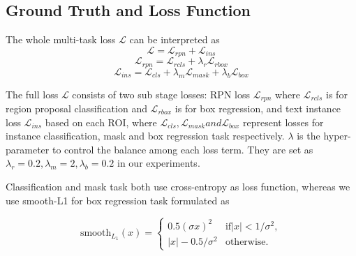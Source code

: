 \documentclass[a4paper,conference]{IEEEtran}
\begin{document}
\subsection{Ground Truth and Loss Function}
The whole multi-task loss \begin{math}\mathcal{L}\end{math} can be interpreted as 
\begin{equation}
    \mathcal{L} =  \mathcal{L}_{rpn} + \mathcal{L}_{ins}
\end{equation}
\begin{equation}
    \mathcal{L}_{rpn} =  \mathcal{L}_{rcls} + \lambda_{r}\mathcal{L}_{rbox}
\end{equation}
\begin{equation}
    \mathcal{L}_{ins} =  \mathcal{L}_{cls} + \lambda_{m}\mathcal{L}_{mask} +  \lambda_{b}\mathcal{L}_{box}
\end{equation}

The full loss \begin{math}\mathcal{L}\end{math} consists of two sub stage losses: RPN loss \begin{math}\mathcal{L}_{rpn}\end{math} where \begin{math}\mathcal{L}_{rcls}\end{math} is for region proposal classification and \begin{math}\mathcal{L}_{rbox}\end{math} is for box regression, and text instance loss \begin{math}\mathcal{L}_{ins}\end{math} based on each ROI, where \begin{math}\mathcal{L}_{cls},\mathcal{L}_{mask} and \mathcal{L}_{box}\end{math} represent losses for instance classification, mask and box regression task respectively. \begin{math}\lambda\end{math} is the hyper-parameter to control the balance among each loss term. They are set as  \begin{math}\lambda_{r}=0.2, \lambda_{m}=2, \lambda_{b}=0.2\end{math} in our experiments.

Classification and mask task both use cross-entropy as loss function, whereas we use smooth-L1 for box regression task formulated as 

\begin{equation}
\text{smooth}_{L_1}\left(x\right) = 
\left\{\begin{matrix}
0.5(\sigma x)^{2} & \text{if} \left | x \right |  < 1/\sigma^{2} , \\ 
\left |x\right | - 0.5/\sigma^{2} & \text{otherwise} .
\end{matrix}\right.
\end{equation}
\end{document}
